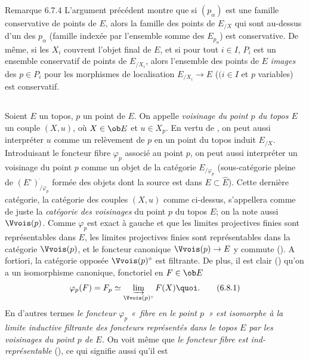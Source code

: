 \documentclass[10pt]{../fichiers-configuration-latex/smfart}
\begin{document}
\begin{enonce*}[remark]{Remarque 6.7.4}
L'argument précédent montre que si $(p_{\alpha})$ est une famille
conservative de points de $E$, alors la famille des points de
$E_{/X}$ qui sont au-dessus d'un des $p_{\alpha}$ (famille indexée
par l'ensemble somme des $E_{p_{\alpha}}$) est conservative. De
même, si les $X_i$ couvrent l'objet final de $E$, et si pour tout
$i\in I$, $P_i$ est un ensemble conservatif de points de $E_{/X_i}$,
alors l'ensemble des points de $E$ \emph{images} des $p\in P_i$ pour
les morphismes de localisation $E_{/X_i}\rightarrow E$ ($(i\in I$ et
$p$ variables) est conservatif.
\end{enonce*}

\setcounter{subsection}{7}
\subsection{}
Soient $E$ un topos, $p$ un point de $E$. On appelle \emph{voisinage
du point $p$ du topos $E$} un couple $(X,u)$, où $X\in \ob E$ et
$u\in X_p$. En vertu de , on peut aussi interpréter $u$
comme un relèvement de $p$ en un point du topos induit $E_{/X}$.
Introduisant le foncteur fibre $\varphi_p$ associé au point $p$, on
peut aussi interpréter un voisinage du point $p$ comme un objet de
la catégorie $E_{/\varphi_p}$ (sous-catégorie pleine de
$(E^\circ)^{\widehat{\phantom{,}}}_{/\varphi_p}$ formée des objets
dont la source est dans $E\subset \widehat{E}$). Cette dernière
catégorie, \ie la catégorie des couples $(X,u)$ comme ci-dessus,
s'appellera comme de juste la \emph{catégorie des voisinages} du
point $p$ du topos $E$; on la note aussi $\Vvois(p)$. Comme
$\varphi_p$\pageoriginale est exact à gauche et que les limites
projectives finies sont représentables dans $E$, les limites
projectives finies sont représentables dans la catégorie
$\Vvois(p)$, et le foncteur canonique $\Vvois(p)\rightarrow E$ y
commute (). A fortiori, la catégorie opposée
$\Vvois(p)^{\circ}$ est filtrante. De plus, il est clair
() qu'on a un isomorphisme canonique, fonctoriel en
$F\in \ob E$
\begin{equation*}
\varphi_p(F)=F_p\simeq
\varinjlim_{\Vvois(p)^{\circ}}F(X){\quoi}.\tag{6.8.1}
\end{equation*}
En d'autres termes \emph{le foncteur $\varphi_p$ « fibre en le
point $p$ »  est isomorphe à la limite inductive filtrante des
foncteurs représentés dans le topos $E$ par les voisinages du point
$p$ de $E$.} On voit même que \emph{le foncteur fibre est
ind-représentable} (), ce qui signifie aussi qu'il est
\end{document}
